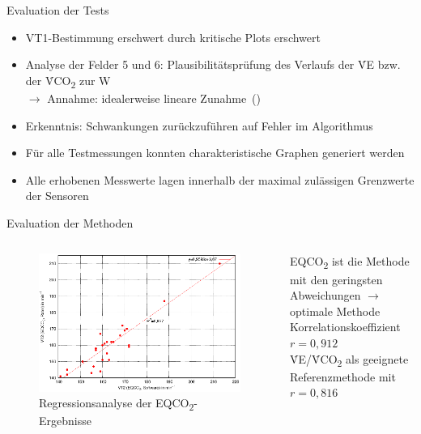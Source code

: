 \documentclass[colorBG,slideColor,8pt]{beamer}
\newcommand{\eqcotwo}{EQCO\textsubscript{2}}
\newcommand{\vcotwo}{\.{V}CO\textsubscript{2}}
\newcommand{\ve}{\.{V}E}
\begin{document}
\begin{frame}{Evaluation der Tests}
\begin{itemize}
	\item VT1-Bestimmung erschwert durch kritische Plots erschwert
	\item Analyse der Felder 5 und 6: Plausibilitätsprüfung des Verlaufs der \ve{} bzw. der \vcotwo{} zur W\\$\rightarrow$ Annahme: idealerweise lineare Zunahme~(\cite{Ruehle.2012})
	\item Erkenntnis: Schwankungen zurückzuführen auf Fehler im Algorithmus
	\item Für alle Testmessungen konnten charakteristische Graphen generiert werden
	\item Alle erhobenen Messwerte lagen innerhalb der maximal zulässigen Grenzwerte der Sensoren
\end{itemize}
\end{frame}

\begin{frame}{Evaluation der Methoden}
\begin{columns}
\begin{column}{0.5\linewidth}
\begin{figure}[H]
	\centering
	\includegraphics[width=\linewidth]{Bilder/korr_eqco2.eps}
	\caption{Regressionsanalyse der \eqcotwo-Ergebnisse}
\end{figure}
\end{column}
\begin{column}{0.5\linewidth}
	\eqcotwo{} ist die Methode mit den geringsten Abweichungen $\rightarrow$ optimale Methode\\
	\vspace{3ex}
	Korrelationskoeffizient $r = 0,912$\\
	\vspace{3ex}
	\ve/\vcotwo{} als geeignete Referenzmethode mit $r = 0,816$
\end{column}
\end{columns}
\end{frame}
\end{document}
